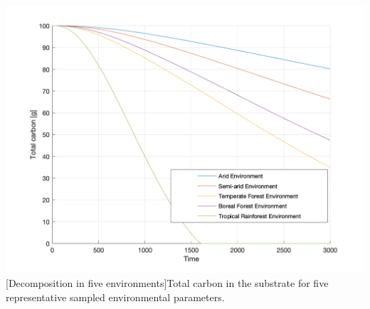 \documentclass[12pt]{article}
\begin{document}
\begin{center}\label{Decay Environments}
\includegraphics[width=\linewidth]{direct_compare_decom_environment.png}
\vspace*{-6ex}
[Decomposition in five environments]{Total carbon in the substrate for five representative sampled environmental parameters.}
\end{center}
\end{document}
